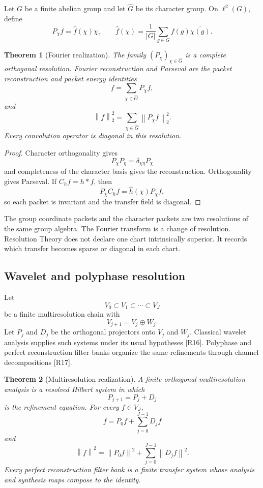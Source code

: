 \documentclass{aomart}
\newtheorem{theorem}{Theorem}[section]
\theoremstyle{definition}
\theoremstyle{remark}
\newcommand{\norm}[1]{\left\lVert#1\right\rVert}
\newcommand{\Rcite}[1]{\textup{[#1]}}
\begin{document}
Let \(G\) be a finite abelian group and let \(\widehat G\) be its character group. On \(\ell^2(G)\), define
\[
 P_\chi f
 =
 \widehat f(\chi)\chi,
 \qquad
 \widehat f(\chi)
 =
 \frac1{|G|}\sum_{g\in G}f(g)\overline{\chi(g)}.
\]

\begin{theorem}[Fourier realization]\label{thm:fourier_realization}
The family \((P_\chi)_{\chi\in\widehat G}\) is a complete orthogonal resolution. Fourier reconstruction and Parseval are the packet reconstruction and packet energy identities
\[
 \boxed{
 f=\sum_{\chi\in\widehat G}P_\chi f,
 }
\]
and
\[
 \boxed{
 \norm{f}_2^2
 =
 \sum_{\chi\in\widehat G}\norm{P_\chi f}_2^2.
 }
\]
Every convolution operator is diagonal in this resolution.
\end{theorem}

\begin{proof}
Character orthogonality gives
\[
 P_\chi P_\eta
 =
 \delta_{\chi\eta}P_\chi
\]
and completeness of the character basis gives the reconstruction. Orthogonality gives Parseval. If \(C_hf=h*f\), then
\[
 P_\chi C_hf
 =
 \widehat h(\chi)P_\chi f,
\]
so each packet is invariant and the transfer field is diagonal.
\end{proof}

\begin{remark}\label{rem:fourier_chart}
The group coordinate packets and the character packets are two resolutions of the same group algebra. The Fourier transform is a change of resolution. Resolution Theory does not declare one chart intrinsically superior. It records which transfer becomes sparse or diagonal in each chart.
\end{remark}

\subsection{Wavelet and polyphase resolution}

Let
\[
 V_0\subset V_1\subset\cdots\subset V_J
\]
be a finite multiresolution chain with
\[
 V_{j+1}=V_j\oplus W_j.
\]
Let \(P_j\) and \(D_j\) be the orthogonal projectors onto \(V_j\) and \(W_j\). Classical wavelet analysis supplies such systems under its usual hypotheses \Rcite{R16}. Polyphase and perfect reconstruction filter banks organize the same refinements through channel decompositions \Rcite{R17}.

\begin{theorem}[Multiresolution realization]\label{thm:wavelet_realization}
A finite orthogonal multiresolution analysis is a resolved Hilbert system in which
\[
 P_{j+1}=P_j+D_j
\]
is the refinement equation. For every \(f\in V_J\),
\[
 \boxed{
 f=P_0f+\sum_{j=0}^{J-1}D_jf
 }
\]
and
\[
 \boxed{
 \norm f^2
 =
 \norm{P_0f}^2
 +
 \sum_{j=0}^{J-1}\norm{D_jf}^2.
 }
\]
Every perfect reconstruction filter bank is a finite transfer system whose analysis and synthesis maps compose to the identity.
\end{theorem}
\end{document}
